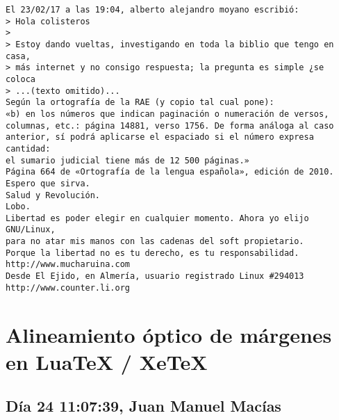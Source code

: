 \documentclass[a4paper,10pt]{article}
\begin{document}
\begin{lstlisting}
El 23/02/17 a las 19:04, alberto alejandro moyano escribió:
> Hola colisteros
> 
> Estoy dando vueltas, investigando en toda la biblio que tengo en casa,
> más internet y no consigo respuesta; la pregunta es simple ¿se coloca
> ...(texto omitido)...
Según la ortografía de la RAE (y copio tal cual pone):
«b) en los números que indican paginación o numeración de versos,
columnas, etc.: página 14881, verso 1756. De forma análoga al caso
anterior, sí podrá aplicarse el espaciado si el número expresa cantidad:
el sumario judicial tiene más de 12 500 páginas.»
Página 664 de «Ortografía de la lengua española», edición de 2010.
Espero que sirva.
Salud y Revolución.
Lobo.
Libertad es poder elegir en cualquier momento. Ahora yo elijo GNU/Linux,
para no atar mis manos con las cadenas del soft propietario.
Porque la libertad no es tu derecho, es tu responsabilidad.
http://www.mucharuina.com
Desde El Ejido, en Almería, usuario registrado Linux #294013
http://www.counter.li.org

\end{lstlisting}
\section{Alineamiento óptico de márgenes en LuaTeX / XeTeX}

\subsection{Día 24 11:07:39, Juan Manuel Macías}
\end{document}
